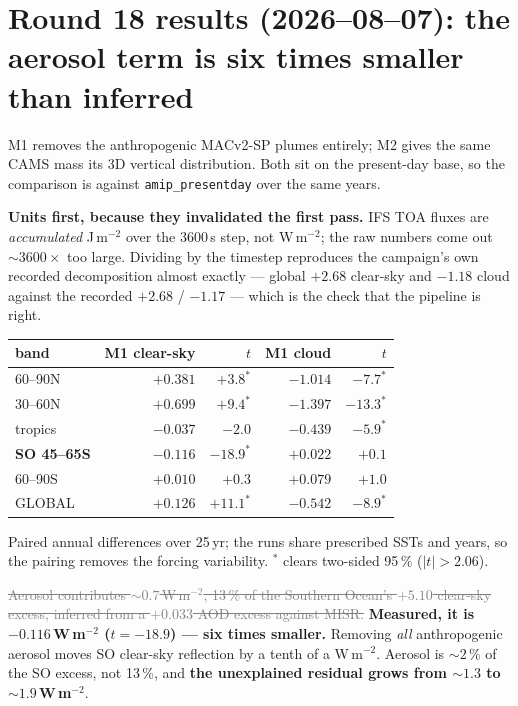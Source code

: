 \documentclass[10pt]{article}
\newcommand{\dead}[1]{\textcolor{gray}{\sout{#1}}}
\begin{document}
\section{Round 18 results (2026--08--07): the aerosol term is six times smaller than
inferred}\label{sec:r18res}
M1 removes the anthropogenic MACv2-SP plumes entirely; M2 gives the same CAMS mass its 3D
vertical distribution. Both sit on the present-day base, so the comparison is against
\texttt{amip\_presentday} over the same years.

\textbf{Units first, because they invalidated the first pass.} IFS TOA fluxes are
\emph{accumulated} J\,m$^{-2}$ over the 3600\,s step, not W\,m$^{-2}$; the raw numbers come
out ${\sim}3600\times$ too large. Dividing by the timestep reproduces the campaign's own
recorded decomposition almost exactly --- global $+2.68$ clear-sky and $-1.18$ cloud against
the recorded $+2.68$ / $-1.17$ --- which is the check that the pipeline is right.

\begin{center}\footnotesize
\begin{tabular}{l r r r r}
\toprule
band & M1 clear-sky & $t$ & M1 \textbf{cloud} & $t$ \\
\midrule
60--90N & $+0.381$ & $+3.8^*$ & $\mathbf{-1.014}$ & $-7.7^*$ \\
30--60N & $+0.699$ & $+9.4^*$ & $\mathbf{-1.397}$ & $-13.3^*$ \\
tropics & $-0.037$ & $-2.0$ & $-0.439$ & $-5.9^*$ \\
\textbf{SO 45--65S} & $\mathbf{-0.116}$ & $\mathbf{-18.9^*}$ & $+0.022$ & $+0.1$ \\
60--90S & $+0.010$ & $+0.3$ & $+0.079$ & $+1.0$ \\
GLOBAL & $+0.126$ & $+11.1^*$ & $\mathbf{-0.542}$ & $-8.9^*$ \\
\bottomrule
\end{tabular}
\end{center}

\noindent Paired annual differences over 25\,yr; the runs share prescribed SSTs and years,
so the pairing removes the forcing variability. $^*$ clears two-sided 95\,\% ($|t|>2.06$).

\dead{Aerosol contributes ${\sim}0.7$\,W\,m$^{-2}$, 13\,\% of the Southern Ocean's $+5.10$
clear-sky excess, inferred from a $+0.033$ AOD excess against MISR.} \textbf{Measured, it is
$-0.116$\,W\,m$^{-2}$ ($t=-18.9$) --- six times smaller.} Removing \emph{all} anthropogenic
aerosol moves SO clear-sky reflection by a tenth of a W\,m$^{-2}$. Aerosol is ${\sim}2$\,\%
of the SO excess, not 13\,\%, and \textbf{the unexplained residual grows from ${\sim}1.3$ to
${\sim}1.9$\,W\,m$^{-2}$}.
\end{document}
